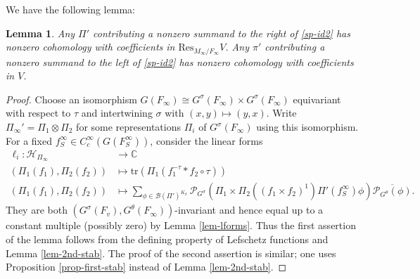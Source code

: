 \documentclass[12pt]{amsart}
\newtheorem{lem}[thm]{Lemma}
\theoremstyle{remark}
\numberwithin{equation}{section}
\newcommand{\lto}{\longrightarrow}
\newcommand{\CC}{\mathbb{C}}
\theoremstyle{definition}
\numberwithin{equation}{subsection}
\begin{document}
We have the following lemma:
\begin{lem} \label{lem-cohomol} Any $\Pi'$ contributing a nonzero summand to the right of \eqref{sp-id2}
 has nonzero cohomology with coefficients in $\mathrm{Res}_{M_{\infty}/F_{\infty}}V$.  Any $\pi'$ contributing a nonzero summand to the left of
 \eqref{sp-id2} has nonzero cohomology with coefficients in $V$.
\end{lem}
\begin{proof} Choose an isomorphism $G(F_{\infty}) \cong G^{\sigma}(F_{\infty}) \times G^{\sigma}(F_{\infty})$ equivariant with respect to $\tau$ and intertwining $\sigma$ with $(x,y) \mapsto (y,x)$.
 Write $\Pi_{\infty}'=\Pi_1 \otimes \Pi_2$ for some representations $\Pi_i$ of $G^{\sigma}(F_{\infty})$ using this isomorphism.
For a fixed $f_{S}^{\infty} \in C_c^{\infty}(G(F_S^{\infty}))$, consider the linear forms
\begin{align*}
\ell_i:\mathcal{H}_{\Pi_{\infty}} &\lto \CC\\
(\Pi_1(f_1),\Pi_2(f_2)) &\longmapsto \mathrm{tr}\left( \Pi_{1}(f_1^{-\tau}*f_2 \circ \tau )\right)\\
(\Pi_1(f_1),\Pi_2(f_2)) & \longmapsto \sum_{\phi \in \mathcal{B}(\Pi')^{K_S}} \mathcal{P}_{G^{\sigma}}(\Pi_1 \times \Pi_2((f_1 \times f_2)^1)\Pi'(f_S^{\infty})\phi) \overline{\mathcal{P}_{G^{\theta}}(\phi)}.
\end{align*}
They are both $(G^{\sigma}(F_v),G^{\theta}(F_{\infty}))$-invariant and hence equal up to a constant multiple (possibly zero) by Lemma \ref{lem-lforms}.  Thus the first assertion of the lemma follows from the defining property of Lefschetz functions \cite[Proposition 8.4]{BLS} and Lemma \ref{lem-2nd-stab}.  The proof of the second assertion is similar; one uses Proposition \ref{prop-first-stab} instead of Lemma \ref{lem-2nd-stab}.
\end{proof}
\end{document}
